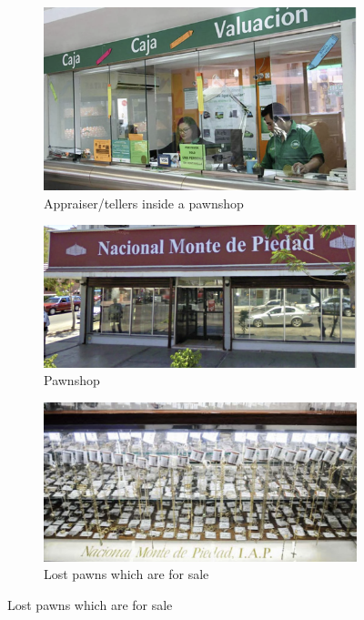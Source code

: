 \documentclass[11pt]{article}
\begin{document}
\vspace{.1in}
\begin{figure}[H]
     \caption{Some Pawnshops}
    \label{PawnshopPicture}
    \begin{center}
    \begin{subfigure}{0.5\textwidth}
    \caption{Appraiser/tellers inside a pawnshop}
        \centering
        \includegraphics[width=\textwidth]{Figuras/empenio9.png}
    \end{subfigure}
    
    \vspace{3ex}
    \begin{subfigure}{0.5\textwidth}
    \caption{Pawnshop}
        \centering
        \includegraphics[width=\textwidth]{Figuras/empenio2.png}
    \end{subfigure}
       \vspace{3ex}
       
    \begin{subfigure}{0.5\textwidth}
    \caption{Lost pawns which are for sale}
        \centering
        \includegraphics[width=\textwidth]{Figuras/empenio3.png}
    \end{subfigure}
       \vspace{3ex}
       

\end{center}
\end{figure}
\end{document}
